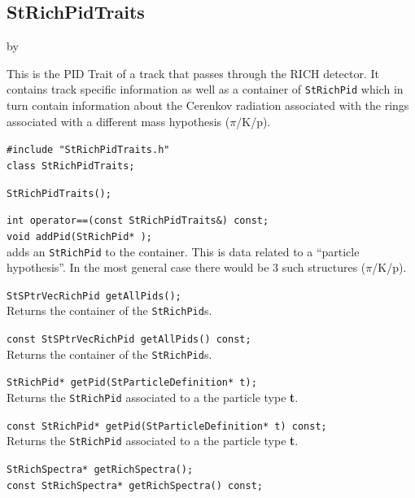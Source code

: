 \documentclass[twoside]{article}
\newcommand{\entrylabel}[1]{\mbox{\textbf{{#1}}}\hfil}%
\newenvironment{entry}
{\begin{list}{}%
    {\renewcommand{\makelabel}{\entrylabel}%
     \setlength{\labelwidth}{90pt}%
     \setlength{\leftmargin}{\labelwidth}
     \advance\leftmargin by \labelsep%
      }%
    }%
  {\end{list}}
\newcommand{\Entrylabel}[1]%
{\raisebox{0pt}[1ex][0pt]{\makebox[\labelwidth][l]%
    {\parbox[t]{\labelwidth}{\hspace{0pt}\textbf{{#1}}}}}}
\newenvironment{Entry}%
{\renewcommand{\entrylabel}{\Entrylabel}\begin{entry}}%
  {\end{entry}}
\begin{document}
\subsection{StRichPidTraits}
\label{sec:StRichPidTraits}
\begin{Entry}
\item[Summary] This is the PID Trait of a track that
    passes through the RICH detector.  It contains
    track specific information as well as a
    container of \texttt{StRichPid} which in
    turn contain information about the Cerenkov
    radiation associated with the rings associated
    with a different mass hypothesis ($\pi$/K/p).
\item[Synopsis]
    \verb+#include "StRichPidTraits.h"+\\
    \verb+class StRichPidTraits;+\\
\item[Description]
\item[Related Classes]
\item[Public\\ Constructors]
    \verb+StRichPidTraits();+\\
\item[Public Member\\ Functions]
    \verb+int operator==(const StRichPidTraits&) const;+\\
    \verb+void addPid(StRichPid* );+\\
    adds an \texttt{StRichPid} to the container.
    This is data related to a ``particle hypothesis''.
    In the most general case there would be 3 such
    structures ($\pi$/K/p).
    
    \verb+StSPtrVecRichPid getAllPids();+\\
    Returns the container of the \texttt{StRichPid}s.
    
    \verb+const StSPtrVecRichPid getAllPids() const;+\\
    Returns the container of the \texttt{StRichPid}s.

    \verb+StRichPid* getPid(StParticleDefinition* t);+\\
    Returns the \texttt{StRichPid} associated to a
    the particle type {\bf t}.
    
    \verb+const StRichPid* getPid(StParticleDefinition* t) const;+\\
    Returns the \texttt{StRichPid} associated to a
    the particle type {\bf t}.

    \verb+StRichSpectra* getRichSpectra();+\\
    \verb+const StRichSpectra* getRichSpectra() const;+\\


\end{Entry}
\end{document}
